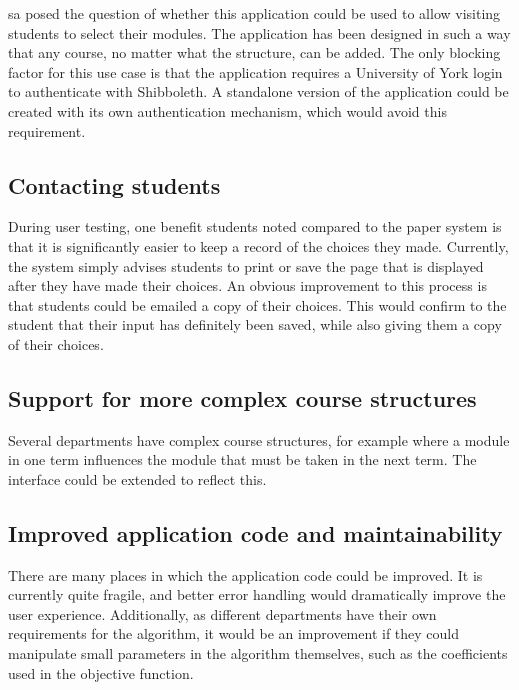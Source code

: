 \gls{sa} posed the question of whether this application could be used to allow
visiting students to select their modules. The application has been designed
in such a way that any course, no matter what the structure, can be added. The
only blocking factor for this use case is that the application requires a
University of York login to authenticate with Shibboleth. A standalone version
of the application could be created with its own authentication mechanism,
which would avoid this requirement.

\subsection{Contacting students}

During user testing, one benefit students noted compared to the paper system
is that it is significantly easier to keep a record of the choices they made.
Currently, the system simply advises students to print or save the page that
is displayed after they have made their choices. An obvious improvement to
this process is that students could be emailed a copy of their choices. This
would confirm to the student that their input has definitely been saved, while
also giving them a copy of their choices.

\subsection{Support for more complex course structures}

Several departments have complex course structures, for example where a module
in one term influences the module that must be taken in the next term. The
interface could be extended to reflect this.

\subsection{Improved application code and maintainability}

There are many places in which the application code could be improved. It is
currently quite fragile, and better error handling would dramatically improve
the user experience. Additionally, as different departments have their own
requirements for the algorithm, it would be an improvement if they could
manipulate small parameters in the algorithm themselves, such as the
coefficients used in the objective function.


